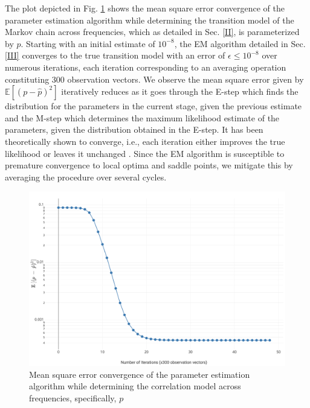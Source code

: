 \documentclass[10pt,twocolumn]{IEEEtran}
\begin{document}
The plot depicted in Fig. \ref{fig:4} shows the mean square error convergence of the parameter estimation algorithm while determining the transition model of the Markov chain across frequencies, which as detailed in Sec. \ref{II}, is parameterized by $p$. Starting with an initial estimate of $10^{-8}$, the EM algorithm detailed in Sec. \ref{III} converges to the true transition model with an error of $\epsilon \leq 10^{-8}$ over numerous iterations, each iteration corresponding to an averaging operation constituting 300 observation vectors. We observe the mean square error given by $\mathbb{E}[(p - \hat{p})^{2}]$ iteratively reduces as it goes through the E-step which finds the distribution for the parameters in the current stage, given the previous estimate and the M-step which determines the maximum likelihood estimate of the parameters, given the distribution obtained in the E-step. It has been theoretically shown to converge, i.e., each iteration either improves the true likelihood or leaves it unchanged \cite{Neal1998}. Since the EM algorithm is susceptible to premature convergence to local optima and saddle points, we mitigate this by averaging the procedure over several cycles.
\begin{figure}
    \centering
    \includegraphics[width=1.0\linewidth]{ParameterEstimatorConvergence.png}
    \caption{Mean square error convergence of the parameter estimation algorithm while determining the correlation model across frequencies, specifically, $p$}
    \label{fig:4}
\end{figure}
\end{document}
